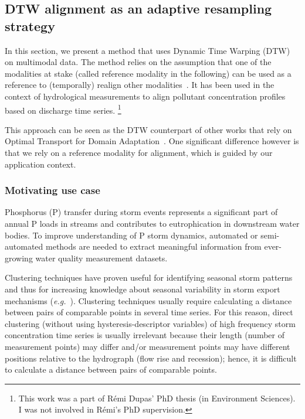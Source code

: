 \subsection{DTW alignment as an adaptive resampling strategy}

In this section, we present a method that uses Dynamic Time Warping (DTW)
on multimodal data.
The method relies on the assumption that one of the modalities at stake (called
reference modality in the following) can be used as a reference to (temporally)
realign other modalities~\cite{dupas:halshs-01228397}.
It has been used in the context of hydrological measurements to align pollutant
concentration profiles based on discharge time series.%
\footnote{This work was a part of Rémi Dupas' PhD thesis (in Environment
Sciences).
I was not involved in Rémi's PhD supervision.}

This approach can be seen as the DTW counterpart of other works that rely on
Optimal Transport for Domain Adaptation~\cite{courty:hal-02112785}.
One significant difference however is that we rely on a reference modality for
alignment, which is guided by our application context.

\subsubsection{Motivating use case}

Phosphorus (P) transfer during storm events represents a significant part of
annual P loads in streams and contributes to eutrophication in downstream water
bodies. To improve understanding of P storm dynamics, automated or
semi-automated methods are needed to extract meaningful information from
ever-growing water quality measurement datasets.

Clustering techniques have proven useful for identifying seasonal storm
patterns and thus for increasing knowledge about seasonal variability in storm
export mechanisms (\emph{e.g.}~\cite{aubert:halshs-00906292}).
Clustering techniques usually require calculating a distance between pairs of
comparable points in several time series. For this reason, direct clustering
(without using hysteresis-descriptor variables) of high frequency storm
concentration time series is usually irrelevant because their length (number of
measurement points) may differ and/or measurement points may have different
positions relative to the hydrograph (flow rise and recession); hence, it is
difficult to calculate a distance between pairs of comparable points.


